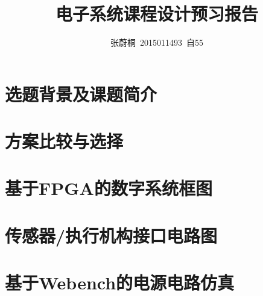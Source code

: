 \documentclass[UTF8,a4paper]{paper}
\title{电子系统课程设计预习报告}
\author{张蔚桐\ 2015011493\ 自55}
\begin{document}
\newcommand{\tabincell}[2]{\begin{tabular}{@{}#1@{}}#2\end{tabular}}
\maketitle
\tableofcontents    
\clearpage
\section{选题背景及课题简介}
\section{方案比较与选择}
\section{基于FPGA的数字系统框图}
\section{传感器/执行机构接口电路图}
\section{基于Webench的电源电路仿真}
\end{document}
